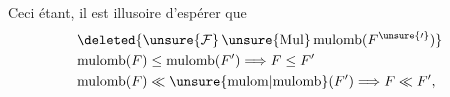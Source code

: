 Ceci étant, il est  illusoire d'espérer que
\[
\begin{aligned}
&\deleted{\unsure{\mathcal F}\,\unsure{\mathrm{Mul}}\,\mathrm{mulomb}(F^{\unsure{\prime}})}\\
&\mathrm{mulomb}(F)\leq\mathrm{mulomb}(F')\Longrightarrow F\leq F'\\
&\mathrm{mulomb}(F)\ll\unsure{\mathrm{mulom}|\mathrm{mulomb}}(F')\Longrightarrow F\ll F',
\end{aligned}
\]
